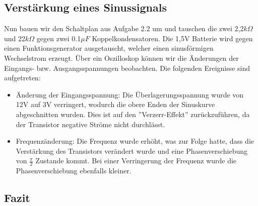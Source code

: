 \subsection{Verstärkung eines Sinussignals}

Nun bauen wir den Schaltplan aus Aufgabe 2.2 um und tauschen die zwei 2,2\(k\Omega\) und 22\(k\Omega\) gegen zwei 0.1\(\mu F\) Koppelkondensatoren. Die 1,5V Batterie wird gegen einen Funktionsgenerator ausgetauscht, welcher einen sinusförmigen Wechselstrom erzeugt. Über ein Oszilloskop können wir die Änderungen der Eingangs- bzw. Ausgangsspannungen beobachten. Die folgenden Ereignisse sind aufgetreten:

\begin{itemize}
\item Änderung der Eingangsspannung: Die Überlagerungsspannung wurde von 12V auf 3V verringert, wodurch die obere Enden der Sinuskurve abgeschnitten wurden. Dies ist auf den ''Verzerr-Effekt'' zurückzuführen, da der Transistor negative Ströme nicht durchlässt.
\item Frequenzänderung: Die Frequenz wurde erhöht, was zur Folge hatte, dass die Verstärkung des Transistors verändert wurde und eine Phasenverschiebung von \(\frac{\pi}{2}\) Zustande kommt. Bei einer Verringerung der Frequenz wurde die Phasenverschiebung ebenfalls kleiner.
\end{itemize}

\newpage
\subsection{Fazit}